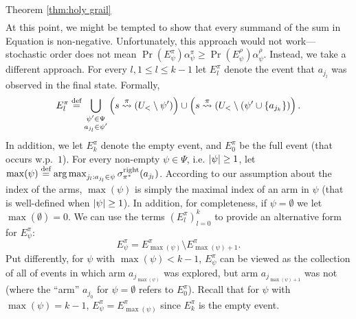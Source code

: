 \begin{proofof}{Theorem \ref{thm:holy grail}}
\begin{align}
\end{align}
At this point, we might be tempted to show that every summand of the sum in Equation  is non-negative. Unfortunately, this approach would not work---stochastic order does not mean $\Pr(E^\pi_\psi) \alpha^\pi_\psi\geq \Pr(E^\rho_\psi) \alpha^\rho_\psi$. Instead, we take a different approach. For every $l, 1\leq l \leq k-1$ let $E^\pi_{l}$ denote the event that $a_{j_l}$ was observed in the final state. Formally,
\[
E^\pi_{l} \stackrel{\text{def}}{=}  \bigcup_{\substack{\psi' \in \Psi\\a_{j_l} \in \psi' }} \left(s\stackrel{\pi}{\rightsquigarrow}(U_<\setminus \psi')\right)\cup\left(s\stackrel{\pi}{\rightsquigarrow}(U_<\setminus (\psi' \cup \{a_{j_k}\})\right).
\]
In addition, we let $E^\pi_{k}$ denote the empty event, and $E^\pi_{0}$ be the full event (that occurs w.p.~$1$).   For every non-empty $\psi \in \Psi$, i.e. $\left| \psi \right|\geq 1$, let $\max(\psi)\stackrel{\text{def}}{=}\operatorname*{arg\,max}_{j_l:{a_{j_l}} \in \psi} \sigma^{\textnormal{right}}_{\pi^*}(a_{j_l})$. According to our assumption about the index of the arms, $\max(\psi)$ is simply the maximal index of an arm in $\psi$ (that is well-defined when $\left| \psi \right|\geq 1$). In addition, for completeness, if $\psi=\emptyset$ we let $\max(\emptyset)=0$. We can use the terms $(E^\pi_{l})_{l=0}^k$ to provide an alternative form for $E^\pi_\psi$:
\[
E^\pi_\psi=E^\pi_{\max(\psi)}\setminus E^\pi_{\max(\psi)+1}.
\]
Put differently, for $\psi$ with $\max(\psi)<k-1$, $E^\pi_\psi$ can be viewed as the collection of all of events in which arm $a_{j_{\max(\psi)}}$ was explored, but arm $a_{j_{\max(\psi)+1}}$ was not (where the ``arm'' $a_{j_0}$ for $\psi=\emptyset$ refers to $E^\pi_{0}$). Recall that for $\psi$ with $\max(\psi)=k-1$, $E^\pi_\psi=E^\pi_{\max(\psi)}$ since $E^\pi_{k}$ is the empty event.


\end{proofof}
